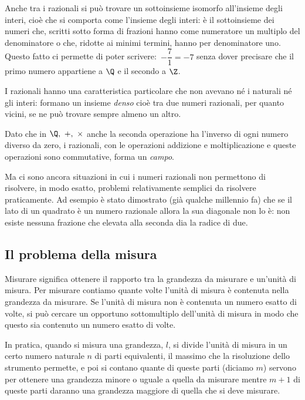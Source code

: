 Anche tra i razionali si può trovare un sottoinsieme isomorfo all'insieme 
degli interi, cioè che si comporta come l'insieme degli interi: è il 
sottoinsieme dei numeri che, scritti sotto forma di frazioni hanno come 
numeratore un multiplo del denominatore o che, ridotte ai minimi termini, 
hanno per denominatore uno. 
Questo fatto ci permette di poter scrivere:~\(-\dfrac{7}{1} = -7\) 
senza dover precisare che il primo numero appartiene a \(\Q\) e il secondo 
a \(\Z\).

I razionali hanno una caratteristica particolare che non avevano né i 
naturali né gli interi: formano un insieme \emph{denso} cioè tra due numeri 
razionali, per quanto vicini, se ne può trovare sempre almeno un altro.

Dato che in \(\Q,~+,~\times\) anche la seconda operazione ha l'inverso di 
ogni numero diverso da zero, i razionali, con le operazioni addizione e 
moltiplicazione e queste operazioni sono commutative, forma un \emph{campo}.

Ma ci sono ancora situazioni in cui i numeri razionali non permettono di 
risolvere, in modo esatto, problemi relativamente semplici da risolvere 
praticamente. 
Ad esempio è stato dimostrato (già qualche millennio fa) che se il lato di 
un quadrato è un numero razionale allora la sua diagonale non lo è:
non esiste nessuna frazione che elevata alla seconda dia la radice di due.

\subsection{Il problema della misura}

Misurare significa ottenere il rapporto tra la grandezza da misurare e 
un'unità di misura.
Per misurare contiamo quante volte l'unità di misura è contenuta nella 
grandezza da misurare.
Se l'unità di misura non è contenuta un numero esatto di volte, si può 
cercare un opportuno sottomultiplo dell'unità di misura in modo che questo 
sia contenuto un numero esatto di volte. 

In pratica, quando si misura una grandezza, \(l\), si divide l'unità di 
misura in un certo numero naturale \(n\) di parti equivalenti, il massimo che 
la risoluzione dello strumento permette,
e poi si contano quante di queste parti (diciamo \(m\)) servono per ottenere 
una grandezza minore o uguale a quella da misurare mentre \(m+1\) di queste 
parti daranno una grandezza maggiore di quella che si deve misurare.


